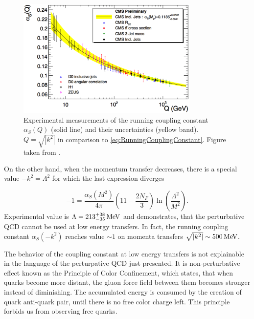 \begin{figure}[t]
  \centering
  \includegraphics[width=0.8\textwidth]{Chapter1/RunningCouplingConstant.png}
  \caption[Experimental measurements of the running coupling constant $\alpha_S(Q)$
          (solid line) and its uncertainty (yellow band).
          $Q=\sqrt{\left|k^2\right|}$ in comparison to
          \eqref{eq:RunningCouplingConstant}.]
          {Experimental measurements of the running
          coupling constant $\alpha_S(Q)$ (solid line) and their uncertainties (yellow
          band).  $Q=\sqrt{\left|k^2\right|}$ in comparison to
          \eqref{eq:RunningCouplingConstant}. Figure taken from
          \cite{RunningCouplingConstantMess}. }
  \label{fig:RunningCouplingConstant}
\end{figure}

On the other hand, when the momentum transfer decreases, there is a special value
$-k^2=\Lambda^2$ for which the last expression diverges

\begin{equation}
  -1 = \frac{\alpha_S(M^2)}{4\pi} \left( 11 - \frac{2N_F}{3} \right)
  \ln \left( \frac{\Lambda^2}{M^2} \right).
  \label{eq:RunningLambda}
\end{equation}
Experimental value is $\Lambda=213^{+38}_{-35}\,\text{MeV}$ \cite{wiki:QCDHistory} and
demonstrates, that the perturbative QCD cannot be used at low energy transfers.
In fact, the running coupling constant $\alpha_S(-k^2)$ reaches value $\sim 1$
on momenta transfers $\sqrt{\left| k^2 \right|} \sim 500\,\text{MeV}$. 

The behavior of the coupling constant at low energy transfers is not explainable in
the language of the perturpative QCD just presented. It is non-perturbative effect
known as the Principle of Color Confinement, which states, that when quarks
become more distant, the gluon force field between them becomes stronger instead of
diminishing. The accumulated energy is consumed by the creation of quark
anti-quark pair, until there is no free color charge left. This principle
forbids us from observing free quarks.

